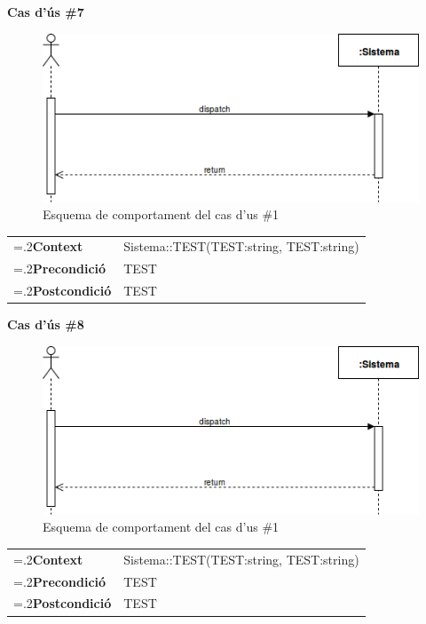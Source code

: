 \clearpage
\noindent\textbf{\large Cas d'ús \#7}\\
\begin{figure}[H]
\centering
\includegraphics[scale=0.6]{Figures/casdus_00.png}
\caption{Esquema de comportament del cas d'us \#1}
\end{figure}
\begin{table}[h]
\noindent
\begin{tabularx}{\linewidth}{
>{\hsize=.2\hsize}X%
>{\hsize=0.8\hsize}X%
}
\textbf{Context} 		& Sistema::TEST(TEST:string, TEST:string) \\
\textbf{Precondició} 	& TEST \\
\textbf{Postcondició}	& TEST \\
\end{tabularx}
\label{}
\end{table}

\noindent\textbf{\large Cas d'ús \#8}\\
\begin{figure}[H]
\centering
\includegraphics[scale=0.6]{Figures/casdus_00.png}
\caption{Esquema de comportament del cas d'us \#1}
\end{figure}
\begin{table}[h]
\noindent
\begin{tabularx}{\linewidth}{
>{\hsize=.2\hsize}X%
>{\hsize=0.8\hsize}X%
}
\textbf{Context} 		& Sistema::TEST(TEST:string, TEST:string) \\
\textbf{Precondició} 	& TEST \\
\textbf{Postcondició}	& TEST \\
\end{tabularx}
\label{}
\end{table}

